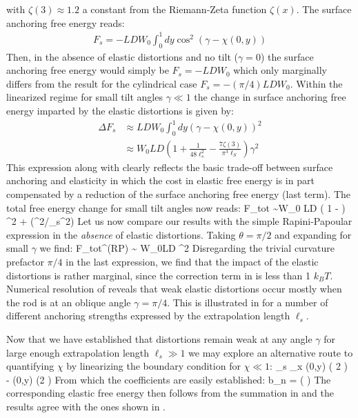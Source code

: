 with $\zeta(3) \approx 1.2 $ a constant from the Riemann-Zeta function $\zeta(x)$. The surface anchoring free energy reads:
\begin{align}
F_{s} = - LDW_{0} \int_{0}^{1} dy \cos^{2} (\gamma - \chi(0,y))
\end{align}
Then, in the absence of elastic distortions and no tilt ($\gamma = 0$) the surface anchoring free energy would simply be $F_{s} = -LDW_{0}$ which only marginally differs from the result for the cylindrical case $F_{s} = -(\pi/4)LDW_{0}$.
Within the linearized regime for small tilt angles $\gamma \ll 1$  the change in surface anchoring free energy imparted by the elastic distortions is given by:
\begin{align}
\Delta F_{s} &\approx LDW_{0}  \int_{0}^{1} dy  (\gamma - \chi(0,y))^{2}  \nonumber \\
& \approx W_{0} LD  \left ( 1 + \frac{1}{48 \ell_{s}^{2}} - \frac{7  \zeta(3)}{ \pi^{3} \ell_{S}} \right) \gamma^{2}
\end{align}
This expression along with  clearly reflects the basic trade-off between surface anchoring and elasticity in which the cost in elastic free energy is in part compensated by a reduction of the surface anchoring free energy (last term). The total free energy change for small tilt angles now reads:
\beq
\Delta  F_{\rm tot} \sim  W_{0} LD \left ( 1  -   \right ) \gamma^{2} + (\gamma^{2}/\ell_{s}^{2})
\label{ftiltcorr}
\eeq
Let us now compare our results with the simple Rapini-Papoular expression  in the {\em absence} of elastic distortions. Taking $\theta=\pi/2$ and expanding for small $\gamma $ we find:
 \beq
 \Delta  F_{\rm tot}^{(RP)} \sim {} W_{0}LD \gamma^{2}
\eeq
Disregarding the trivial curvature prefactor $\pi/4$ in the last expression, we find that the impact of the elastic distortions is rather marginal, since the correction term in   is less than 1 $k_{B}T$. Numerical resolution of  reveals that weak elastic distortions  occur mostly when the rod is at an oblique angle $\gamma = \pi/4$.
This is illustrated in  for a number of different anchoring strengths expressed by the extrapolation length $\ell_{s}$.

Now that we have established that distortions remain weak at any angle $\gamma$ for large enough extrapolation length $\ell_{s}  \gg 1$ we may explore an alternative route to quantifying $\chi$ by linearizing the boundary condition  for $\chi \ll 1$:
\beq
\ell_{s} \partial_{x} \chi(0,y)\approx {} \sin ( 2 \gamma) - \chi(0,y) \cos (2 \gamma )
\label{bcweak}
\eeq
From which the coefficients are easily established:
\beq
b_{n}  =  \left ( \right )
\eeq
The corresponding elastic free energy then follows from the summation in  and the results agree with the ones shown in .







